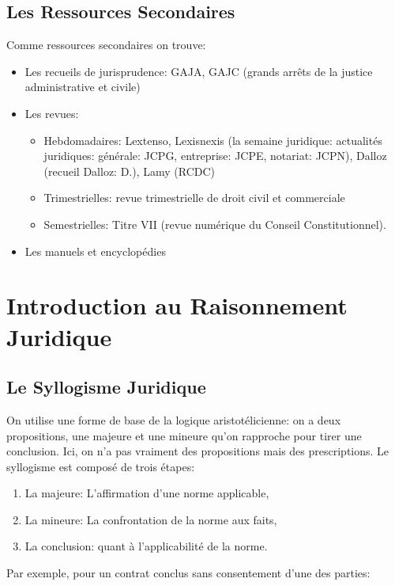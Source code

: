 \documentclass[math]{cours}
\begin{document}
\subsection*{Les Ressources Secondaires}
Comme ressources secondaires on trouve:
\begin{itemize}
	\item Les recueils de jurisprudence: GAJA, GAJC (grands arrêts de la justice administrative et civile)
	\item Les revues:
		\begin{itemize}
			\item Hebdomadaires: Lextenso, Lexisnexis (la semaine juridique: actualités juridiques: générale: JCPG, entreprise: JCPE, notariat: JCPN), Dalloz (recueil Dalloz: D.), Lamy (RCDC)
			\item Trimestrielles: revue trimestrielle de droit civil et commerciale
			\item Semestrielles: Titre VII (revue numérique du Conseil Constitutionnel).
		\end{itemize}
	\item Les manuels et encyclopédies
\end{itemize}

\section{Introduction au Raisonnement Juridique}
\subsection{Le Syllogisme Juridique}
On utilise une forme de base de la logique aristotélicienne: on a deux propositions, une majeure et une mineure qu'on rapproche pour tirer une conclusion.
Ici, on n'a pas vraiment des propositions mais des prescriptions.
Le syllogisme est composé de trois étapes:
\begin{enumerate}
	\item La majeure: L'affirmation d'une norme applicable,
	\item La mineure: La confrontation de la norme aux faits,
	\item La conclusion: quant à l'applicabilité de la norme.
\end{enumerate}

Par exemple, pour un contrat conclus sans consentement d'une des parties:
\end{document}
